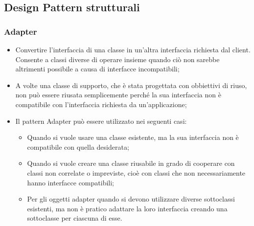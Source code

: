 \subsection{Design Pattern strutturali}
\subsubsection{Adapter}
\begin{itemize}
\item {} Convertire l'interfaccia di una classe in un'altra interfaccia richiesta dal client. Consente a classi diverse di operare insieme quando ciò non sarebbe altrimenti possibile a causa di interfacce incompatibili;
\item {} A volte una classe di supporto, che è stata progettata con obbiettivi di riuso, non può essere riusata semplicemente perché la sua interfaccia non è compatibile con l'interfaccia richiesta da un'applicazione;
\item {} Il pattern Adapter può essere utilizzato nei seguenti casi:
\begin{itemize}
\item Quando si vuole usare una classe esistente, ma la sua interfaccia non è compatibile con quella desiderata;
\item Quando si vuole creare una classe riusabile in grado di cooperare con classi non correlate o impreviste, cioè con classi che non necessariamente hanno interfacce compatibili;
\item Per gli oggetti adapter quando si devono utilizzare diverse sottoclassi esistenti, ma non è pratico adattare la loro interfaccia creando una sottoclasse per ciascuna di esse.
\end{itemize}
\end{itemize}

